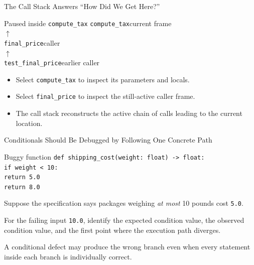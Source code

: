 \documentclass[aspectratio=169,10pt]{beamer}
\begin{document}
\begin{frame}{The Call Stack Answers ``How Did We Get Here?''}
  \begin{block}{Paused inside \texttt{compute\_tax}}
    \centering
    \texttt{compute\_tax}\quad current frame\\
    $\uparrow$\\
    \texttt{final\_price}\quad caller\\
    $\uparrow$\\
    \texttt{test\_final\_price}\quad earlier caller
  \end{block}

  \begin{itemize}
    \item Select \texttt{compute\_tax} to inspect its parameters and locals.
    \item Select \texttt{final\_price} to inspect the still-active caller frame.
    \item The call stack reconstructs the active chain of calls leading to the current location.
  \end{itemize}
\end{frame}

\begin{frame}{Conditionals Should Be Debugged by Following One Concrete Path}
  \begin{block}{Buggy function}
    \texttt{def shipping\_cost(weight: float) -> float:}\\
    \hspace*{0.20in}\texttt{if weight < 10:}\\
    \hspace*{0.40in}\texttt{return 5.0}\\
    \hspace*{0.20in}\texttt{return 8.0}
  \end{block}

  Suppose the specification says packages weighing \emph{at most} 10 pounds cost \texttt{5.0}.

  \begin{activity}
    For the failing input \texttt{10.0}, identify the expected condition value, the observed condition value, and the first point where the execution path diverges.
  \end{activity}

  \begin{keyidea}
    A conditional defect may produce the wrong branch even when every statement inside each branch is individually correct.
  \end{keyidea}
\end{frame}
\end{document}
